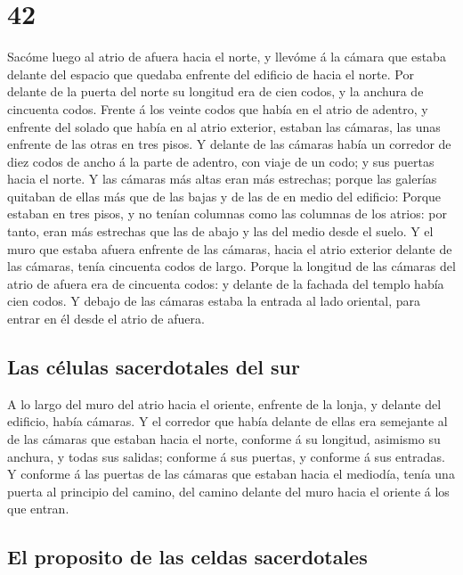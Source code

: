 \hypertarget{section-41}{%
\section{42}\label{section-41}}

 Sacóme luego al atrio de afuera hacia el norte, y llevóme á
la cámara que estaba delante del espacio que quedaba enfrente del
edificio de hacia el norte.  Por delante de la puerta del
norte su longitud era de cien codos, y la anchura de cincuenta codos.
 Frente á los veinte codos que había en el atrio de adentro,
y enfrente del solado que había en al atrio exterior, estaban las
cámaras, las unas enfrente de las otras en tres pisos.  Y
delante de las cámaras había un corredor de diez codos de ancho á la
parte de adentro, con viaje de un codo; y sus puertas hacia el norte.
 Y las cámaras más altas eran más estrechas; porque las
galerías quitaban de ellas más que de las bajas y de las de en medio del
edificio:  Porque estaban en tres pisos, y no tenían
columnas como las columnas de los atrios: por tanto, eran más estrechas
que las de abajo y las del medio desde el suelo.  Y el muro
que estaba afuera enfrente de las cámaras, hacia el atrio exterior
delante de las cámaras, tenía cincuenta codos de largo. 
Porque la longitud de las cámaras del atrio de afuera era de cincuenta
codos: y delante de la fachada del templo había cien codos. 
Y debajo de las cámaras estaba la entrada al lado oriental, para entrar
en él desde el atrio de afuera.

\hypertarget{las-cuxe9lulas-sacerdotales-del-sur}{%
\subsection{Las células sacerdotales del
sur}\label{las-cuxe9lulas-sacerdotales-del-sur}}

 A lo largo del muro del atrio hacia el oriente, enfrente
de la lonja, y delante del edificio, había cámaras.  Y el
corredor que había delante de ellas era semejante al de las cámaras que
estaban hacia el norte, conforme á su longitud, asimismo su anchura, y
todas sus salidas; conforme á sus puertas, y conforme á sus entradas.
 Y conforme á las puertas de las cámaras que estaban hacia
el mediodía, tenía una puerta al principio del camino, del camino
delante del muro hacia el oriente á los que entran.

\hypertarget{el-proposito-de-las-celdas-sacerdotales}{%
\subsection{El proposito de las celdas
sacerdotales}\label{el-proposito-de-las-celdas-sacerdotales}}

